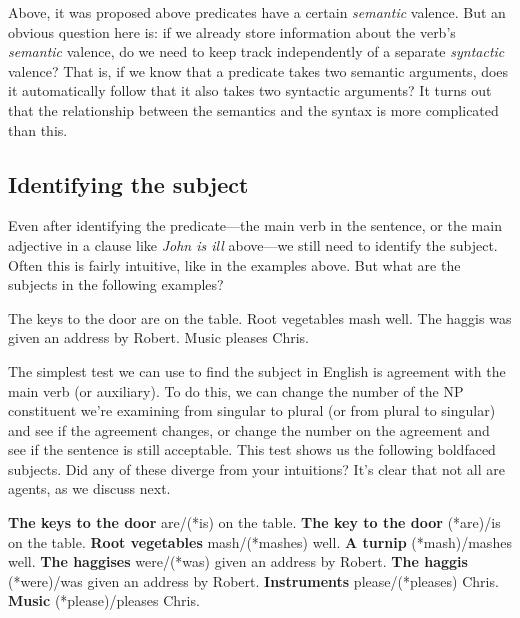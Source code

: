 \documentclass{article}
\begin{document}
Above, it was proposed above predicates have a certain \emph{semantic} valence. 
But an obvious question here is: if we already store information about the verb's \emph{semantic} valence, do we need to keep track independently of a separate \emph{syntactic} valence?  
That is, if we know that a predicate takes two semantic arguments, does it automatically follow that it also takes two syntactic arguments?
It turns out that the relationship between the semantics and the syntax is more complicated than this. 

    \subsection{Identifying the subject}
Even after identifying the predicate---the main verb in the sentence, or the main adjective in a  clause like \emph{John is ill} above---we still need to identify the subject. Often this is fairly intuitive, like in the examples above. But what are the subjects in the following examples?

\ea \label{ex:agreement}
    \ea The keys to the door are on the table.
    \ex Root vegetables mash well.
    \ex The haggis was given an address by Robert.
    \ex Music pleases Chris.
    \z
\z

The simplest test we can use to find the subject in English is agreement with the main verb (or auxiliary). To do this, we can change the number of the NP constituent we're examining from singular to plural (or from plural to singular) and see if the agreement changes, or change the number on the agreement and see if the sentence is still acceptable. This test shows us the following boldfaced subjects. Did any of these diverge from your intuitions? It's clear that not all are agents, as we discuss next.

\ea
    \ea \textbf{The keys to the door} are/(*is) on the table.
    \ex \textbf{The key to the door} (*are)/is on the table.
    \ex \textbf{Root vegetables} mash/(*mashes) well.
    \ex \textbf{A turnip} (*mash)/mashes well.
    \ex \textbf{The haggises} were/(*was) given an address by Robert.
    \ex \textbf{The haggis} (*were)/was given an address by Robert.
    \ex \textbf{Instruments} please/(*pleases) Chris.
    \ex \textbf{Music} (*please)/pleases Chris.
    \z
\z
\end{document}
